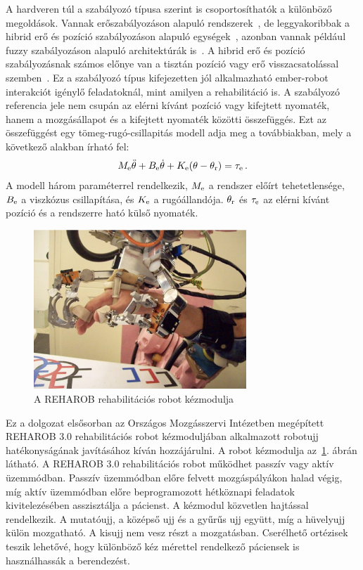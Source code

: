 A hardveren túl a szabályozó típusa szerint is csoportosíthatók a különböző megoldások. Vannak erőszabályozáson 
alapuló rendszerek~\citep{kovacs2003dynamics}, de leggyakoribbak a hibrid erő és 
pozíció szabályozáson alapuló egységek~\citep{Hua2019,Xie2021}, azonban vannak például fuzzy szabályozáson alapuló architektúrák is~\citep{Hu2023}.
A hibrid erő és pozíció szabályozásnak számos előnye van a tisztán pozíció vagy erő visszacsatolással 
szemben~\citep{hogan1984Impedance,hogan1985ImpedancePART1,hogan1985ImpedancePART2,hogan1985ImpedancePART3,kovacs2003dynamics,stepan2001vibrations}.
Ez a szabályozó típus kifejezetten jól alkalmazható ember-robot interakciót igénylő feladatoknál, mint amilyen 
a rehabilitáció is. A szabályozó referencia jele nem csupán 
az elérni kívánt pozíció vagy kifejtett nyomaték, hanem a mozgásállapot és a kifejtett
nyomaték közötti összefüggés. Ezt az összefüggést egy 
tömeg-rugó-csillapitás modell adja meg a továbbiakban, mely a következő alakban
írható fel: 
\begin{align}
    M_{\mathrm{e}} \ddot \theta + B_{\mathrm{e}} \dot \theta + K_{\mathrm{e}} (\theta - \theta_{\mathrm{r}}) = \tau_{\mathrm{e}}\,.
\end{align}
A modell három paraméterrel rendelkezik, $M_{\mathrm{e}}$ a rendszer előírt tehetetlensége, 
$B_{\mathrm{e}}$ a viszkózus csillapítása, és $K_{\mathrm{e}}$ a rugóállandója. 
$\theta_{\mathrm{r}}$ és $\tau_{\mathrm{e}}$ az elérni kívánt pozíció és a rendszerre ható külső nyomaték. 

\begin{figure}[t!]
	\begin{center}
		\includegraphics[width=8cm]{images/reharob_hand_module.png}
		\caption{A REHAROB rehabilitációs robot kézmodulja}\label{fig:reharob_hand_module}
	\end{center}
\end{figure}

Ez a dolgozat elsősorban az Országos Mozgásszervi Intézetben megépített REHAROB 3.0 
rehabilitációs robot kézmoduljában alkalmazott robotujj hatékonyságának javításához kíván hozzájárulni.
A robot kézmodulja az~\ref{fig:reharob_hand_module}. ábrán látható.
A REHAROB 3.0 rehabilitációs robot működhet passzív vagy aktív üzemmódban. Passzív üzemmódban előre felvett 
mozgáspályákon halad végig, míg aktív üzemmódban előre beprogramozott hétköznapi feladatok 
kivitelezésében asszisztálja a pácienst. A kézmodul közvetlen hajtással rendelkezik. A mutatóujj, a középső ujj és a
gyűrűs ujj együtt, míg a hüvelyujj külön mozgatható. A kisujj nem vesz részt a mozgatásban. Cserélhető ortézisek 
teszik lehetővé, hogy különböző kéz mérettel rendelkező páciensek is használhassák a berendezést.



